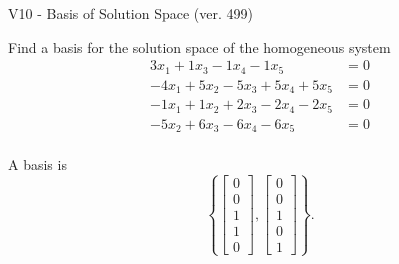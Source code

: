 \begin{exercise}
  \begin{exerciseTitle}V10 - Basis of Solution Space (ver. 499)\end{exerciseTitle}
  \begin{exerciseStatement}
    Find a basis for the solution space of the homogeneous system 
\begin{align*}
 3 x_ 1 + 1 x_ 3 -1 x_ 4 -1 x_ 5 &= 0  \\ 
  -4 x_ 1 + 5 x_ 2 -5 x_ 3 + 5 x_ 4 + 5 x_ 5 &= 0  \\ 
  -1 x_ 1 + 1 x_ 2 + 2 x_ 3 -2 x_ 4 -2 x_ 5 &= 0  \\ 
  -5 x_ 2 + 6 x_ 3 -6 x_ 4 -6 x_ 5 &= 0  \\ 
 \end{align*}


 
  \end{exerciseStatement}

  \begin{exerciseAnswer}
   A basis is   
\[\left\{\left[\begin{array}{c}
0 \\
0 \\
1 \\
1 \\
0
\end{array}\right] , \left[\begin{array}{c}
0 \\
0 \\
1 \\
0 \\
1
\end{array}\right]\right\}.\]

  


  \end{exerciseAnswer}
\end{exercise}